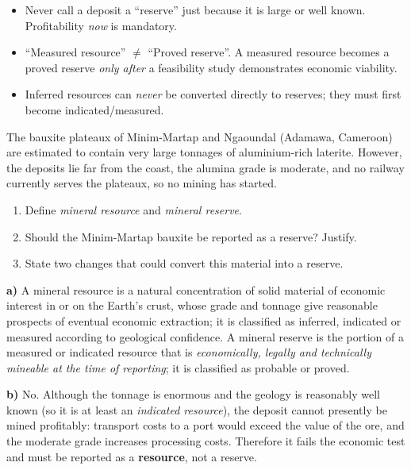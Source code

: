\documentclass[11pt]{article}
\newcommand{\cle}[1]{{\popxbold\color{popdark}#1}}
\begin{document}
\begin{attention}
\begin{itemize}
\item Never call a deposit a ``reserve'' just because it is large or well known. Profitability \emph{now} is mandatory.
\item ``Measured resource'' $\neq$ ``Proved reserve''. A measured resource becomes a proved reserve \emph{only after} a feasibility study demonstrates economic viability.
\item Inferred resources can \emph{never} be converted directly to reserves; they must first become indicated/measured.
\end{itemize}
\end{attention}

\begin{exoresolu}
The bauxite plateaux of Minim-Martap and Ngaoundal (Adamawa, Cameroon) are estimated to contain very large tonnages of aluminium-rich laterite. However, the deposits lie far from the coast, the alumina grade is moderate, and no railway currently serves the plateaux, so no mining has started.
\begin{enumerate}
\item[a)] Define \emph{mineral resource} and \emph{mineral reserve}.
\item[b)] Should the Minim-Martap bauxite be reported as a reserve? Justify.
\item[c)] State two changes that could convert this material into a reserve.
\end{enumerate}
\tcblower
\textbf{a)} A \cle{mineral resource} is a natural concentration of solid material of economic interest in or on the Earth's crust, whose grade and tonnage give reasonable prospects of eventual economic extraction; it is classified as inferred, indicated or measured according to geological confidence. A \cle{mineral reserve} is the portion of a measured or indicated resource that is \emph{economically, legally and technically mineable at the time of reporting}; it is classified as probable or proved.

\textbf{b)} No. Although the tonnage is enormous and the geology is reasonably well known (so it is at least an \emph{indicated resource}), the deposit cannot presently be mined profitably: transport costs to a port would exceed the value of the ore, and the moderate grade increases processing costs. Therefore it fails the economic test and must be reported as a \textbf{resource}, not a reserve.


\end{exoresolu}
\end{document}
